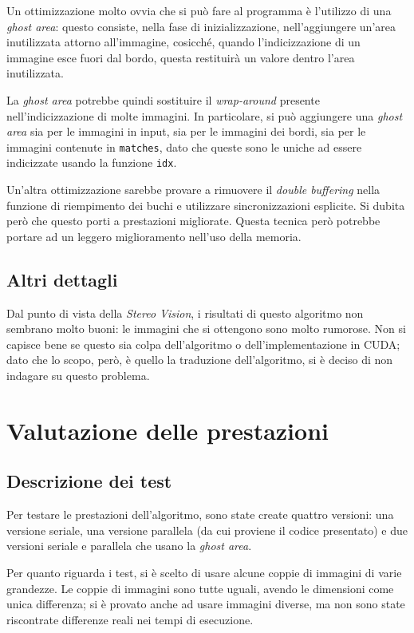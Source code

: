 \documentclass[12pt,a4paper,openright,twoside]{report}
\begin{document}
Un ottimizzazione molto ovvia che si può fare al programma è l'utilizzo di una \textit{ghost area}: questo consiste, nella fase di inizializzazione, nell'aggiungere un'area inutilizzata attorno all'immagine, cosicché, quando l'indicizzazione di un immagine esce fuori dal bordo, questa restituirà un valore dentro l'area inutilizzata.

La \textit{ghost area} potrebbe quindi sostituire il \textit{wrap-around} presente nell'indicizzazione di molte immagini. In particolare, si può aggiungere una \textit{ghost area} sia per le immagini in input, sia per le immagini dei bordi, sia per le immagini contenute in \verb|matches|, dato che queste sono le uniche ad essere indicizzate usando la funzione \verb|idx|.

Un'altra ottimizzazione sarebbe provare a rimuovere il \textit{double buffering} nella funzione di riempimento dei buchi e utilizzare sincronizzazioni esplicite. Si dubita però che questo porti a prestazioni migliorate. Questa tecnica però potrebbe portare ad un leggero miglioramento nell'uso della memoria.

\section{Altri dettagli}

Dal punto di vista della \textit{Stereo Vision}, i risultati di questo algoritmo non sembrano molto buoni: le immagini che si ottengono sono molto rumorose. Non si capisce bene se questo sia colpa dell'algoritmo o dell'implementazione in CUDA; dato che lo scopo, però, è quello la traduzione dell'algoritmo, si è deciso di non indagare su questo problema.


\chapter{Valutazione delle prestazioni}

\section{Descrizione dei test}

Per testare le prestazioni dell'algoritmo, sono state create quattro versioni: una versione seriale, una versione parallela (da cui proviene il codice presentato) e due versioni seriale e parallela che usano la \textit{ghost area}.

Per quanto riguarda i test, si è scelto di usare alcune coppie di immagini di varie grandezze. Le coppie di immagini sono tutte uguali, avendo le dimensioni come unica differenza; si è provato anche ad usare immagini diverse, ma non sono state riscontrate differenze reali nei tempi di esecuzione.
\end{document}
